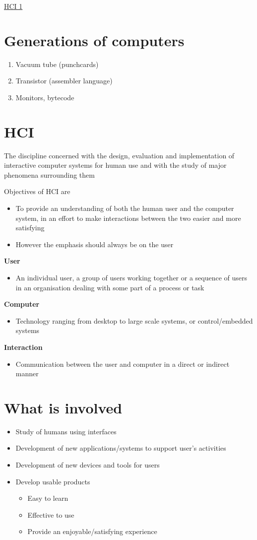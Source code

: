 \documentclass{article}[18pt]
\begin{document}
\begin{center}
\underline{\huge HCI 1}
\end{center}
\section{Generations of computers}
\begin{enumerate}
	\item Vacuum tube (punchcards)
	\item Transistor (assembler language)
	\item Monitors, bytecode
\end{enumerate}
\section{HCI}
\begin{defin}[HCI]
The discipline concerned with the design, evaluation and implementation of interactive computer systems for human use and with the study of major phenomena surrounding them
\end{defin}
Objectives of HCI are
\begin{itemize}
	\item To provide an understanding of both the human user and the computer system, in an effort to make interactions between the two easier and more satisfying
	\item However the emphasis should always be on the user
\end{itemize}
\textbf{User}
\begin{itemize}
	\item An individual user, a group of users working together or a sequence of users in an organisation dealing with some part of a process or task
\end{itemize}
\textbf{Computer}
\begin{itemize}
	\item Technology ranging from desktop to large scale systems, or control/embedded systems
\end{itemize}
\textbf{Interaction}
\begin{itemize}
	\item Communication between the user and computer in a direct or indirect manner
\end{itemize}
\section{What is involved}
\begin{itemize}
	\item Study of humans using interfaces
	\item Development of new applications/systems to support user's activities
	\item Development of new devices and tools for users
	\item Develop usable products
	\begin{itemize}
		\item Easy to learn
		\item Effective to use
		\item Provide an enjoyable/satisfying experience
	\end{itemize}
\end{itemize}
\end{document}
